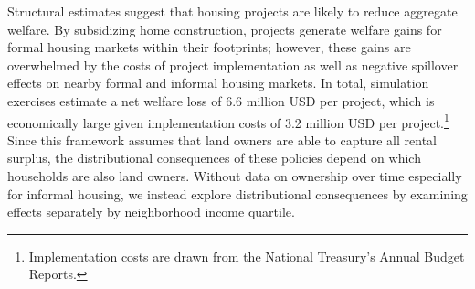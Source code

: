 \documentclass[12pt]{article}
\begin{document}
Structural estimates suggest that housing projects are likely to reduce aggregate welfare.  By subsidizing home construction, projects generate welfare gains for formal housing markets within their footprints; however, these gains are overwhelmed by the costs of project implementation as well as negative spillover effects on nearby formal and informal housing markets.  In total, simulation exercises estimate a net welfare loss of 6.6 million USD per project, which is economically large given implementation costs of 3.2 million USD per project.\footnote{Implementation costs are drawn from the National Treasury's Annual Budget Reports.}  Since this framework assumes that land owners are able to capture all rental surplus, the distributional consequences of these policies depend on which households are also land owners.  Without data on ownership over time especially for informal housing, we instead explore distributional consequences by examining effects separately by neighborhood income quartile.









\end{document}
